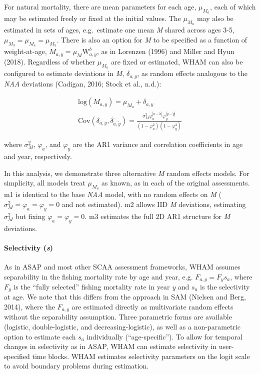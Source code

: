 \documentclass[]{article}
\let\oldparagraph\paragraph
\renewcommand{\paragraph}[1]{\oldparagraph{#1}\mbox{}}
\begin{document}
For natural mortality, there are mean parameters for each age,
\(\mu_{M_a}\), each of which may be estimated freely or fixed at the
initial values. The \(\mu_{M_a}\) may also be estimated in sets of ages,
e.g.~estimate one mean \emph{M} shared across ages 3-5,
\(\mu_{M_3} = \mu_{M_4} = \mu_{M_5}\). There is also an option for
\emph{M} to be specified as a function of weight-at-age,
\(M_{a,y} = \mu_M \text{W}^b_{a,y}\), as in Lorenzen (1996) and Miller
and Hyun (2018). Regardless of whether \(\mu_{M_a}\) are fixed or
estimated, WHAM can also be configured to estimate deviations in
\emph{M}, \(\delta_{a,y}\), as random effects analogous to the
\emph{NAA} deviations (Cadigan, 2016; Stock et al., n.d.):

\begin{equation}
  \begin{array}{cc}
    \text{log}\left( M_{a,y} \right) = \mu_{M_a} + \delta_{a,y} \\
    \text{Cov} \left( \delta_{a,y}, \delta_{\tilde{a},\tilde{y}} \right) = \frac{\sigma^2_M \varphi^{|a-\tilde{a}|}_{a} \varphi^{|y-\tilde{y}|}_{y}}{\left(1-\varphi^2_{a}\right) \left(1-\varphi^2_{y}\right)}
  \end{array}
\end{equation}

where \(\sigma^2_M\), \(\varphi_a\), and \(\varphi_y\) are the AR1
variance and correlation coefficients in age and year, respectively.

In this analysis, we demonstrate three alternative \emph{M} random
effects models. For simplicity, all models treat \(\mu_{M_a}\) as known,
as in each of the original assessments. m1 is identical to the base
\emph{NAA} model, with no random effects on \emph{M}
(\(\sigma^2_M = \varphi_a = \varphi_y = 0\) and not estimated). m2
allows IID \emph{M} deviations, estimating \(\sigma^2_M\) but fixing
\(\varphi_a = \varphi_y = 0\). m3 estimates the full 2D AR1 structure
for \emph{M} deviations.

\hypertarget{selectivity-s}{%
\paragraph{\texorpdfstring{Selectivity
(\emph{s})}{Selectivity (s)}}\label{selectivity-s}}

As in ASAP and most other SCAA assessment frameworks, WHAM assumes
separability in the fishing mortality rate by age and year, e.g.
\(F_{a,y} = F_y s_a\), where \(F_y\) is the ``fully selected'' fishing
mortality rate in year \emph{y} and \(s_a\) is the selectivity at age.
We note that this differs from the approach in SAM (Nielsen and Berg,
2014), where the \(F_{a,y}\) are estimated directly as multivariate
random effects without the separability assumption. Three parametric
forms are available (logistic, double-logistic, and
decreasing-logistic), as well as a non-parametric option to estimate
each \(s_a\) individually (``age-specific''). To allow for temporal
changes in selectivity as in ASAP, WHAM can estimate selectivity in
user-specified time blocks. WHAM estimates selectivity parameters on the
logit scale to avoid boundary problems during estimation.
\end{document}
